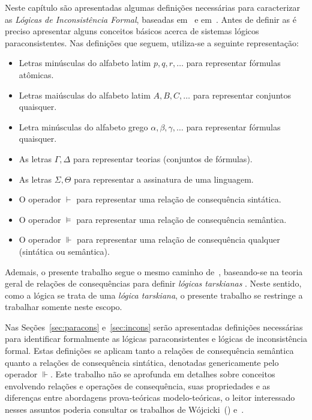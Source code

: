 Neste capítulo são apresentadas algumas definições necessárias para caracterizar as \textit{Lógicas de Inconsistência Formal}, baseadas em~ e em~. Antes de definir as \lfis{} é preciso apresentar alguns conceitos básicos acerca de sistemas lógicos paraconsistentes. Nas definições que seguem, utiliza-se a seguinte representação: 
\begin{itemize}
    \item Letras minúsculas do alfabeto latim $p, q, r, \ldots$ para representar fórmulas atômicas.
    \item Letras maiúsculas do alfabeto latim $A, B, C, \ldots$ para representar conjuntos quaisquer.
    \item Letra minúsculas do alfabeto grego $\alpha, \beta, \gamma, \ldots$ para representar fórmulas quaisquer.
    \item As letras $\Gamma, \Delta$ para representar teorias (conjuntos de fórmulas).
    \item As letras $\Sigma, \Theta$ para representar a assinatura de uma linguagem.
    \item O operador $\vdash$ para representar uma relação de consequência sintática.
    \item O operador $\vDash$ para representar uma relação de consequência semântica.
    \item O operador $\Vdash$ para representar uma relação de consequência qualquer (sintática ou semântica).
\end{itemize}

Ademais, o presente trabalho segue o mesmo caminho de~, baseando-se na teoria geral de relações de consequências para definir \textit{lógicas tarskianas} . Neste sentido, como a lógica \lfium{} se trata de uma \textit{lógica tarskiana}, o presente trabalho se restringe a trabalhar somente neste escopo. 

Nas Seções~\ref{sec:paracons} e~\ref{sec:incons} serão apresentadas definições necessárias para identificar formalmente as lógicas paraconsistentes e lógicas de inconsistência formal. Estas definições se aplicam tanto a relações de consequência semântica quanto a relações de consequência sintática, denotadas genericamente pelo operador $\Vdash$. Este trabalho não se aprofunda em detalhes sobre conceitos envolvendo relações e operações de consequência, suas propriedades e as diferenças entre abordagens prova-teóricas modelo-teóricas, o leitor interessado nesses assuntos poderia consultar os trabalhos de Wójcicki~(\citeyear{Wojcicki1984-WJCLOP,Wojcicki1988-WOJAAT,Wojcicki1988-WOJTOL}) e~.

